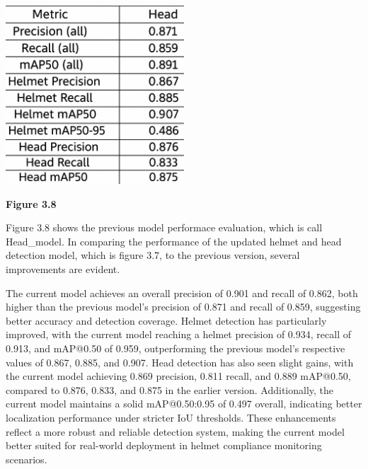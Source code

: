 \begin{center}
	\includegraphics[width=0.5\textwidth]{performance.eva2.png}
	
	\vspace{0.5em}
	\textbf{Figure 3.8}
\end{center}
\noindent\hspace{2.5em}Figure 3.8 shows the previous model performace evaluation, which is call Head\_model. In comparing the performance of the updated helmet and head detection model, which is figure 3.7, to the previous version, several improvements are evident. 

\noindent\hspace{2.5em}The current model achieves an overall precision of 0.901 and recall of 0.862, both higher than the previous model’s precision of 0.871 and recall of 0.859, suggesting better accuracy and detection coverage. Helmet detection has particularly improved, with the current model reaching a helmet precision of 0.934, recall of 0.913, and mAP@0.50 of 0.959, outperforming the previous model’s respective values of 0.867, 0.885, and 0.907. Head detection has also seen slight gains, with the current model achieving 0.869 precision, 0.811 recall, and 0.889 mAP@0.50, compared to 0.876, 0.833, and 0.875 in the earlier version. Additionally, the current model maintains a solid mAP@0.50:0.95 of 0.497 overall, indicating better localization performance under stricter IoU thresholds. These enhancements reflect a more robust and reliable detection system, making the current model better suited for real-world deployment in helmet compliance monitoring scenarios.